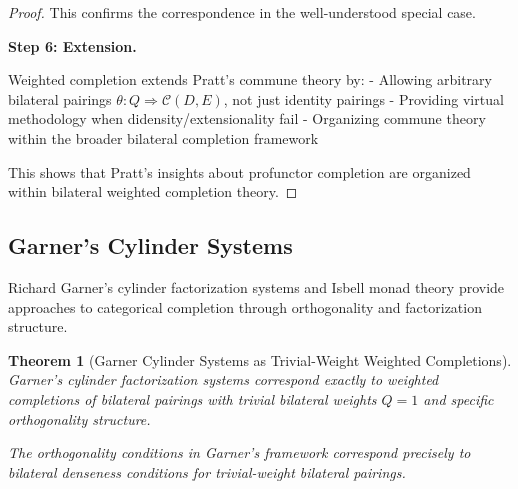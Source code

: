 \documentclass[11pt]{article}
\theoremstyle{plain}
\newtheorem{theorem}{Theorem}[section]
\theoremstyle{definition}
\theoremstyle{remark}
\begin{document}
\begin{proof}
This confirms the correspondence in the well-understood special case.

\textbf{Step 6: Extension.}

Weighted completion extends Pratt's commune theory by:
- Allowing arbitrary bilateral pairings $\theta : Q \Rightarrow \mathcal{C}(D, E)$, not just identity pairings
- Providing virtual methodology when didensity/extensionality fail
- Organizing commune theory within the broader bilateral completion framework

This shows that Pratt's insights about profunctor completion are organized within bilateral weighted completion theory.
\end{proof}

\subsection{Garner's Cylinder Systems}

Richard Garner's cylinder factorization systems \cite{garner2018cylinder} and Isbell monad theory provide approaches to categorical completion through orthogonality and factorization structure.

\begin{theorem}[Garner Cylinder Systems as Trivial-Weight Weighted Completions]\label{thm:garner-cylinder-correspondence}
Garner's cylinder factorization systems correspond exactly to weighted completions of bilateral pairings with trivial bilateral weights $Q = 1$ and specific orthogonality structure.

The orthogonality conditions in Garner's framework correspond precisely to bilateral denseness conditions for trivial-weight bilateral pairings.
\end{theorem}
\end{document}
